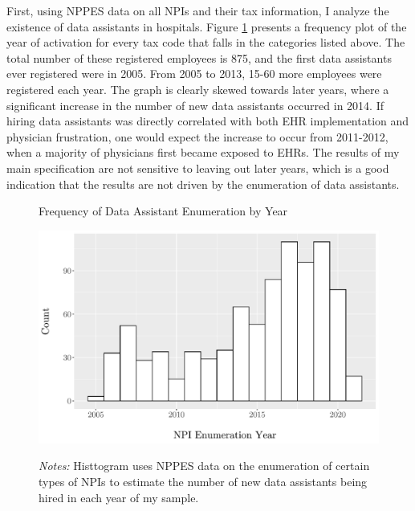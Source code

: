 \documentclass[11pt]{article}
\begin{document}
First, using NPPES data on all NPIs and their tax information, I analyze the existence of data assistants in hospitals. Figure \ref{fig:dataassistant_histogram} presents a frequency plot of the year of activation for every tax code that falls in the categories listed above. The total number of these registered employees is 875, and the first data assistants ever registered were in 2005. From 2005 to 2013, 15-60 more employees were registered each year. The graph is clearly skewed towards later years, where a significant increase in the number of new data assistants occurred in 2014. If hiring data assistants was directly correlated with both EHR implementation and physician frustration, one would expect the increase to occur from 2011-2012, when a majority of physicians first became exposed to EHRs. The results of my main specification are not sensitive to leaving out later years, which is a good indication that the results are not driven by the enumeration of data assistants. 

\begin{figure}[ht]
\centering
\captionsetup{width=.5\linewidth}
\caption{Frequency of Data Assistant Enumeration by Year}
\includegraphics[scale=.5]{Objects/dataassistant_histogram.pdf}
\label{fig:dataassistant_histogram}
\vspace{2mm}
    \caption*{\footnotesize{\textit{Notes:} Histtogram uses NPPES data on the enumeration of certain types of NPIs to estimate the number of new data assistants being hired in each year of my sample.}}
\end{figure}
\end{document}

